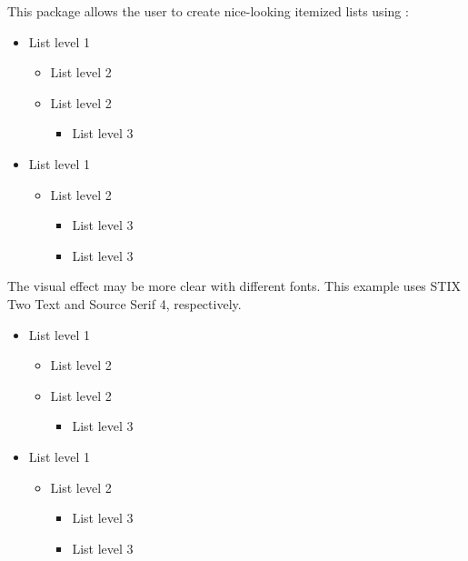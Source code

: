 \documentclass{beery}
\begin{document}
This package allows the user to create nice-looking itemized lists using :

\begin{multicols}{2}
  \begin{itemize}
    \item List level 1
    \begin{itemize}
      \item List level 2
      \item List level 2
      \begin{itemize}
        \item List level 3
      \end{itemize}
    \end{itemize}
    \item List level 1
    \begin{itemize}
      \item List level 2
      \begin{itemize}
        \item List level 3
        \item List level 3
      \end{itemize}
    \end{itemize}
  \end{itemize}
\end{multicols}

The visual effect may be more clear with different fonts.
This example uses STIX Two Text and Source Serif 4, respectively.

\begingroup
  \newfontfamilystixtwo
  \begin{multicols}{2}
    \begin{itemize}
      \item List level 1
      \begin{itemize}
        \item List level 2
        \item List level 2
        \begin{itemize}
          \item List level 3
        \end{itemize}
      \end{itemize}
      \item List level 1
      \begin{itemize}
        \item List level 2
        \begin{itemize}
          \item List level 3
          \item List level 3
        \end{itemize}
      \end{itemize}
    \end{itemize}
  \end{multicols}
\endgroup
\end{document}
